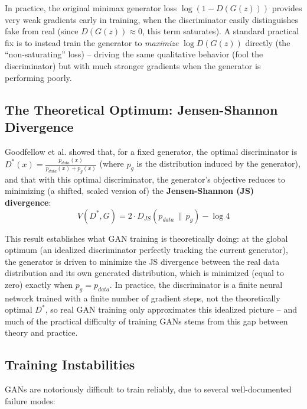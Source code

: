 \documentclass[12pt,a4paper]{article}
\begin{document}
\begin{keyidea}
In practice, the original minimax generator loss $\log(1 - D(G(z)))$ provides very weak gradients early in training, when the discriminator easily distinguishes fake from real (since $D(G(z)) \approx 0$, this term saturates). A standard practical fix is to instead train the generator to \emph{maximize} $\log D(G(z))$ directly (the ``non-saturating'' loss) -- driving the same qualitative behavior (fool the discriminator) but with much stronger gradients when the generator is performing poorly.
\end{keyidea}

\subsection{The Theoretical Optimum: Jensen-Shannon Divergence}

Goodfellow et al. showed that, for a fixed generator, the optimal discriminator is $D^*(x) = \frac{p_{data}(x)}{p_{data}(x) + p_g(x)}$ (where $p_g$ is the distribution induced by the generator), and that with this optimal discriminator, the generator's objective reduces to minimizing (a shifted, scaled version of) the \textbf{Jensen-Shannon (JS) divergence}:
\[
V(D^*, G) = 2 \cdot D_{JS}(p_{data} \,\|\, p_g) - \log 4
\]

\begin{keyidea}
This result establishes what GAN training is theoretically doing: at the global optimum (an idealized discriminator perfectly tracking the current generator), the generator is driven to minimize the JS divergence between the real data distribution and its own generated distribution, which is minimized (equal to zero) exactly when $p_g = p_{data}$. In practice, the discriminator is a finite neural network trained with a finite number of gradient steps, not the theoretically optimal $D^*$, so real GAN training only approximates this idealized picture -- and much of the practical difficulty of training GANs stems from this gap between theory and practice.
\end{keyidea}

\subsection{Training Instabilities}

GANs are notoriously difficult to train reliably, due to several well-documented failure modes:
\end{document}

